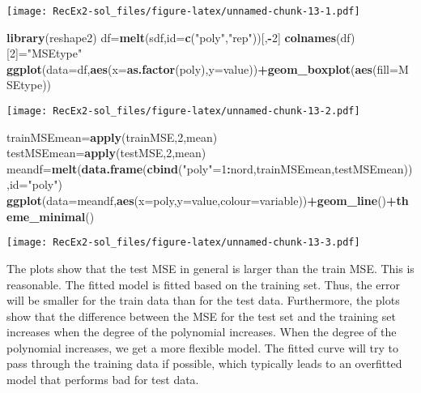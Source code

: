\documentclass[]{article}
\newenvironment{Shaded}{\begin{snugshade}}{\end{snugshade}}
\newcommand{\DataTypeTok}[1]{\textcolor[rgb]{0.13,0.29,0.53}{#1}}
\newcommand{\DecValTok}[1]{\textcolor[rgb]{0.00,0.00,0.81}{#1}}
\newcommand{\KeywordTok}[1]{\textcolor[rgb]{0.13,0.29,0.53}{\textbf{#1}}}
\newcommand{\NormalTok}[1]{#1}
\newcommand{\OperatorTok}[1]{\textcolor[rgb]{0.81,0.36,0.00}{\textbf{#1}}}
\newcommand{\StringTok}[1]{\textcolor[rgb]{0.31,0.60,0.02}{#1}}
\begin{document}
\texttt{[image: RecEx2-sol\_files/figure-latex/unnamed-chunk-13-1.pdf]}

\begin{Shaded}
\begin{Highlighting}[]
\KeywordTok{library}\NormalTok{(reshape2)}
\NormalTok{df=}\KeywordTok{melt}\NormalTok{(sdf,}\DataTypeTok{id=}\KeywordTok{c}\NormalTok{(}\StringTok{"poly"}\NormalTok{,}\StringTok{"rep"}\NormalTok{))[,}\OperatorTok{-}\DecValTok{2}\NormalTok{]}
\KeywordTok{colnames}\NormalTok{(df)[}\DecValTok{2}\NormalTok{]=}\StringTok{"MSEtype"}
\KeywordTok{ggplot}\NormalTok{(}\DataTypeTok{data=}\NormalTok{df,}\KeywordTok{aes}\NormalTok{(}\DataTypeTok{x=}\KeywordTok{as.factor}\NormalTok{(poly),}\DataTypeTok{y=}\NormalTok{value))}\OperatorTok{+}\KeywordTok{geom_boxplot}\NormalTok{(}\KeywordTok{aes}\NormalTok{(}\DataTypeTok{fill=}\NormalTok{MSEtype))}
\end{Highlighting}
\end{Shaded}

\texttt{[image: RecEx2-sol\_files/figure-latex/unnamed-chunk-13-2.pdf]}

\begin{Shaded}
\begin{Highlighting}[]
\NormalTok{trainMSEmean=}\KeywordTok{apply}\NormalTok{(trainMSE,}\DecValTok{2}\NormalTok{,mean)}
\NormalTok{testMSEmean=}\KeywordTok{apply}\NormalTok{(testMSE,}\DecValTok{2}\NormalTok{,mean)}
\NormalTok{meandf=}\KeywordTok{melt}\NormalTok{(}\KeywordTok{data.frame}\NormalTok{(}\KeywordTok{cbind}\NormalTok{(}\StringTok{"poly"}\NormalTok{=}\DecValTok{1}\OperatorTok{:}\NormalTok{nord,trainMSEmean,testMSEmean)),}\DataTypeTok{id=}\StringTok{"poly"}\NormalTok{)}
\KeywordTok{ggplot}\NormalTok{(}\DataTypeTok{data=}\NormalTok{meandf,}\KeywordTok{aes}\NormalTok{(}\DataTypeTok{x=}\NormalTok{poly,}\DataTypeTok{y=}\NormalTok{value,}\DataTypeTok{colour=}\NormalTok{variable))}\OperatorTok{+}\KeywordTok{geom_line}\NormalTok{()}\OperatorTok{+}\KeywordTok{theme_minimal}\NormalTok{()}
\end{Highlighting}
\end{Shaded}

\texttt{[image: RecEx2-sol\_files/figure-latex/unnamed-chunk-13-3.pdf]}

The plots show that the test MSE in general is larger than the train
MSE. This is reasonable. The fitted model is fitted based on the
training set. Thus, the error will be smaller for the train data than
for the test data. Furthermore, the plots show that the difference
between the MSE for the test set and the training set increases when the
degree of the polynomial increases. When the degree of the polynomial
increases, we get a more flexible model. The fitted curve will try to
pass through the training data if possible, which typically leads to an
overfitted model that performs bad for test data.
\end{document}
